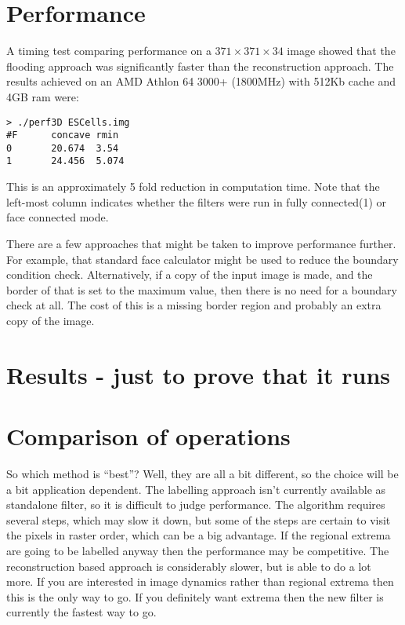 \documentclass{llncs}
\begin{document}
\section{Performance}
A timing test comparing performance on a $371 \times 371 \times 34$
image showed that the flooding approach was significantly faster than
the reconstruction approach. The results achieved on an AMD Athlon 64
3000+ (1800MHz) with 512Kb cache and 4GB ram were:
\begin{verbatim}
> ./perf3D ESCells.img
#F      concave rmin
0       20.674  3.54
1       24.456  5.074
\end{verbatim}
This is an approximately 5 fold reduction in computation time. Note
that the left-most column indicates whether the filters were run in
fully connected(1) or face connected mode.

There are a few approaches that might be taken to improve performance
further. For example, that standard face calculator might be used to
reduce the boundary condition check. Alternatively, if a copy of the
input image is made, and the border of that is set to the maximum
value, then there is no need for a boundary check at all. The cost of
this is a missing border region and probably an extra copy of the
image.

\section{Results - just to prove that it runs}


\section{Comparison of operations}
So which method is ``best''? Well, they are all a bit different, so
the choice will be a bit application dependent. The labelling approach
isn't currently available as standalone filter, so it is difficult to
judge performance. The algorithm requires several steps, which may
slow it down, but some of the steps are certain to visit the pixels in
raster order, which can be a big advantage. If the regional extrema
are going to be labelled anyway then the performance may be
competitive. The reconstruction based approach is considerably slower,
but is able to do a lot more. If you are interested in image dynamics
rather than regional extrema then this is the only way to go. If you
definitely want extrema then the new filter is currently the fastest
way to go.
\end{document}
